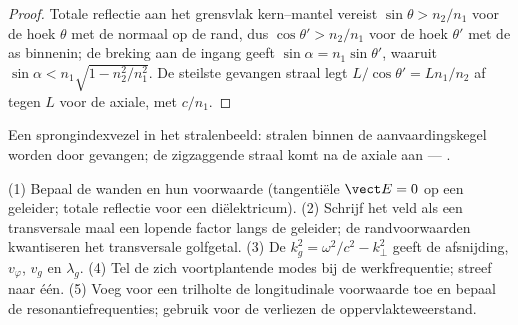 \begin{proof}
Totale reflectie aan het grensvlak kern--mantel vereist
$\sin\theta >
n_2/n_1$ voor de hoek $\theta$ met de normaal op de rand, dus
$\cos
\theta' > n_2/n_1$ voor de hoek $\theta'$ met de as binnenin; de
breking aan de ingang geeft $\sin\alpha = n_1\sin\theta'$, waaruit
$\sin\alpha < n_1\sqrt{1
- n_2^2/n_1^2}$. De steilste gevangen straal legt
$L/\cos\theta' = Ln_1/n_2$ af tegen $L$ voor de axiale, met $c/n_1$.
\end{proof}

\begin{omfigure}

{\small Een sprongindexvezel in het stralenbeeld: stralen binnen de
aanvaardingskegel worden door  gevangen; de
zigzaggende straal komt na de axiale aan --- .}
\end{omfigure}

\begin{method}\label{met:b2:guided-waves:method}
(1) Bepaal de wanden en hun voorwaarde (tangentiële $\vect E = 0$ op een
geleider; totale reflectie voor een diëlektricum). (2) Schrijf het veld als
een transversale  maal een lopende factor langs de geleider; de
randvoorwaarden kwantiseren het transversale golfgetal. (3) De
 $k_g^2 = \omega^2/c^2 - k_\perp^2$ geeft de afsnijding,
$v_\varphi$, $v_g$ en $\lambda_g$. (4) Tel de zich voortplantende modes bij
de werkfrequentie; streef naar één. (5) Voeg voor een trilholte de
longitudinale voorwaarde toe en bepaal de resonantiefrequenties; gebruik
voor de verliezen de oppervlakteweerstand.
\end{method}

